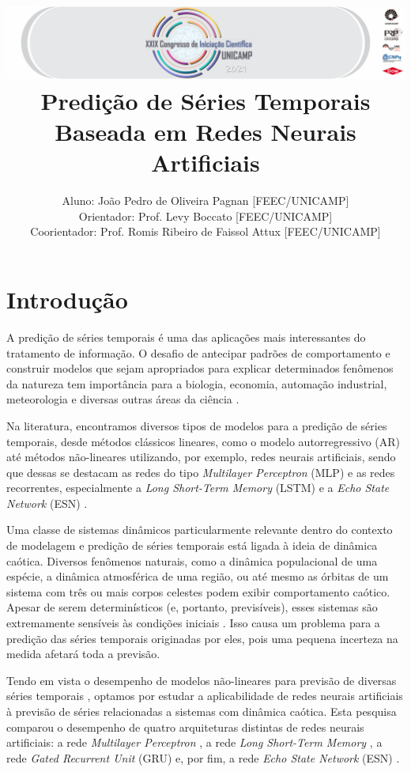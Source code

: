 \documentclass[9pt, technote]{article}
\title{{\noindent \includegraphics[scale = 0.5]{banner-grande.png}}\\ Predição de Séries Temporais Baseada em Redes Neurais
Artificiais}
\author{Aluno: João Pedro de Oliveira Pagnan [FEEC/UNICAMP]\\Orientador: Prof.  Levy Boccato [FEEC/UNICAMP]\\
Coorientador: Prof. Romis Ribeiro de Faissol Attux [FEEC/UNICAMP]}
\begin{document}

\section{Introdução}

A predição de séries temporais é uma das aplicações mais interessantes do tratamento de informação. O desafio de antecipar padrões de comportamento e construir modelos que sejam apropriados para explicar determinados fenômenos da natureza tem importância  para a biologia, economia, automação industrial, meteorologia e diversas outras áreas da ciência \cite{box2015time}.

Na literatura, encontramos diversos tipos de modelos para a  predição de séries temporais, desde métodos clássicos lineares, como o modelo autorregressivo (AR) \cite{box2015time} até métodos não-lineares utilizando, por exemplo, redes neurais artificiais, sendo que dessas se destacam as redes do tipo \textit{Multilayer Perceptron} (MLP) \cite{rosenblatt1958perceptron} e as redes recorrentes, especialmente a \textit{Long Short-Term Memory} (LSTM)  \cite{connor1994recurrent} e a \textit{Echo State Network} (ESN) \cite{jaeger2007echo}.

Uma classe de sistemas dinâmicos particularmente relevante dentro do contexto de modelagem e predição de séries temporais está ligada à ideia de dinâmica caótica. Diversos fenômenos naturais, como a dinâmica populacional de uma espécie, a dinâmica atmosférica de uma região, ou até mesmo as órbitas de um sistema com três ou mais corpos celestes podem exibir comportamento caótico. Apesar de serem determinísticos (e, portanto, previsíveis), esses sistemas são extremamente sensíveis às condições iniciais \cite{fiedler1994caos}. Isso causa um problema para a predição das séries temporais originadas por eles, pois uma pequena incerteza na medida afetará toda a previsão. 

Tendo em vista o desempenho de modelos não-lineares para previsão de diversas séries temporais \cite{connor1994recurrent}, optamos por estudar a aplicabilidade de redes neurais artificiais à previsão de séries relacionadas a sistemas com dinâmica caótica. Esta pesquisa comparou o desempenho de quatro arquiteturas distintas de redes neurais artificiais: a rede \textit{Multilayer Perceptron} \cite{rosenblatt1958perceptron}, a rede \textit{Long Short-Term Memory} \cite{connor1994recurrent}, a rede \textit{Gated Recurrent Unit} (GRU) \cite{cho2014learning} e, por fim, a rede \textit{Echo State Network} (ESN) \cite{jaeger2007echo}.
\end{document}
